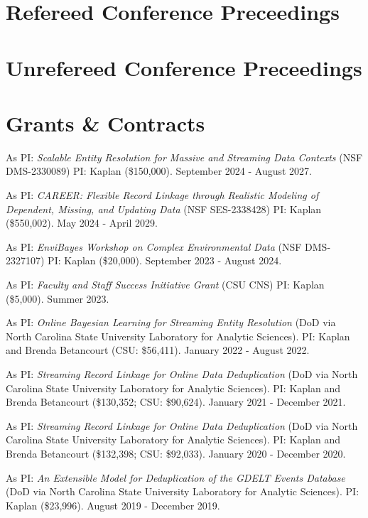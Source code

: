 \documentclass[margin,line]{res}
\begin{document}
\begin{resume}
\printbibliography[keyword=inprep, heading=none]

\section{\sc Refereed Conference Preceedings}
\printbibliography[keyword=conf-ref, heading=none, resetnumbers=false]

\section{\sc Unrefereed Conference Preceedings}
\printbibliography[keyword=conf-unref, heading=none, resetnumbers=false]

\section{\sc Grants \& Contracts}

As PI: {\em Scalable Entity Resolution for Massive and Streaming Data Contexts} (NSF DMS-2330089) PI: Kaplan (\$150,000). September 2024 - August 2027.

As PI: {\em CAREER: Flexible Record Linkage through Realistic Modeling of Dependent, Missing, and Updating Data} (NSF SES-2338428) PI: Kaplan (\$550,002). May 2024 - April 2029. 

As PI: {\em EnviBayes Workshop on Complex Environmental Data} (NSF DMS-2327107) PI: Kaplan (\$20,000). September 2023 - August 2024.

As PI: {\em Faculty and Staff Success Initiative Grant} (CSU CNS) PI: Kaplan (\$5,000). Summer 2023.

As PI: {\em Online Bayesian Learning for Streaming Entity Resolution} (DoD via North Carolina State University Laboratory for Analytic Sciences). PI: Kaplan and Brenda Betancourt (CSU: \$56,411). January 2022 - August 2022.

As PI: {\em Streaming Record Linkage for Online Data Deduplication} (DoD via North Carolina State University Laboratory for Analytic Sciences). PI: Kaplan and Brenda Betancourt (\$130,352; CSU: \$90,624). January 2021 - December 2021.

As PI: {\em Streaming Record Linkage for Online Data Deduplication} (DoD via North Carolina State University Laboratory for Analytic Sciences). PI: Kaplan and Brenda Betancourt (\$132,398; CSU: \$92,033). January 2020 - December 2020.

As PI: {\em An Extensible Model for Deduplication of the GDELT Events Database} (DoD via North Carolina State University Laboratory for Analytic Sciences). PI: Kaplan (\$23,996). August 2019 - December 2019.


\end{resume}
\end{document}
